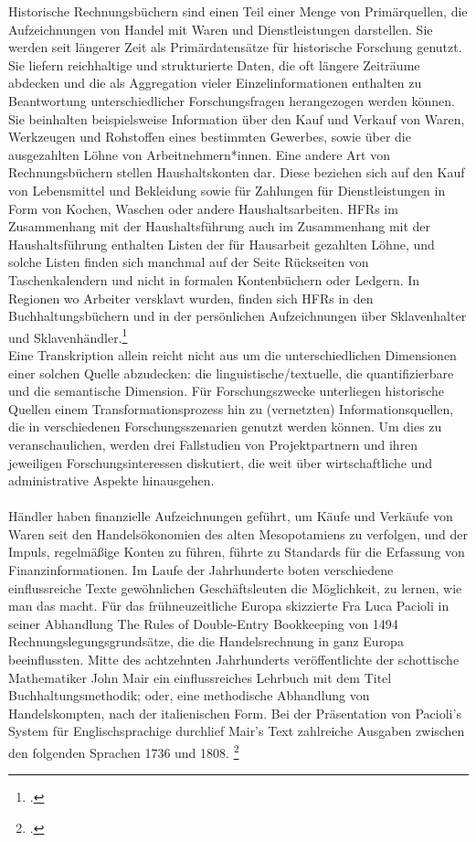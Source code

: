 \documentclass[12pt,a4paper]{article}
\begin{document}
Historische Rechnungsbüchern sind einen Teil einer Menge von Primärquellen, die Aufzeichnungen von Handel mit Waren und Dienstleistungen darstellen. Sie werden seit längerer Zeit als Primärdatensätze für historische Forschung genutzt. Sie liefern reichhaltige und strukturierte Daten, die oft längere Zeiträume abdecken und die als Aggregation vieler Einzelinformationen enthalten zu Beantwortung unterschiedlicher Forschungsfragen herangezogen werden können. Sie beinhalten beispielsweise Information über den Kauf und Verkauf von Waren, Werkzeugen und Rohstoffen eines bestimmten Gewerbes, sowie über die ausgezahlten Löhne von Arbeitnehmern*innen. Eine andere Art von Rechnungsbüchern stellen Haushaltskonten dar. Diese beziehen sich auf den Kauf von Lebensmittel und Bekleidung sowie für Zahlungen für Dienstleistungen in Form von Kochen, Waschen oder andere Haushaltsarbeiten.   HFRs im Zusammenhang mit der Haushaltsführung auch im Zusammenhang mit der Haushaltsführung enthalten Listen der für Hausarbeit gezahlten Löhne, und solche Listen finden sich manchmal auf der Seite Rückseiten von Taschenkalendern und nicht in formalen Kontenbüchern oder Ledgern. In Regionen wo Arbeiter versklavt wurden, finden sich HFRs in den Buchhaltungsbüchern und in der persönlichen Aufzeichnungen über Sklavenhalter und Sklavenhändler.\footcite[][S.2]{tomasek2013encoding}
\\
Eine Transkription allein reicht nicht aus um die unterschiedlichen Dimensionen einer solchen Quelle abzudecken: die linguistische/textuelle, die quantifizierbare und die semantische Dimension. Für Forschungszwecke unterliegen historische Quellen einem Transformationsprozess hin zu (vernetzten) Informationsquellen, die in verschiedenen Forschungsszenarien genutzt werden können. Um dies zu veranschaulichen, werden drei Fallstudien von Projektpartnern und ihren jeweiligen Forschungsinteressen diskutiert, die weit über wirtschaftliche und administrative Aspekte hinausgehen.
\\
\\
Händler haben finanzielle Aufzeichnungen geführt, um Käufe und Verkäufe von Waren seit den Handelsökonomien des alten Mesopotamiens zu verfolgen, und der Impuls, regelmäßige Konten zu führen, führte zu Standards für die Erfassung von Finanzinformationen. Im Laufe der Jahrhunderte boten verschiedene einflussreiche Texte gewöhnlichen Geschäftsleuten die Möglichkeit, zu lernen, wie man das macht. Für das frühneuzeitliche Europa skizzierte Fra Luca Pacioli in seiner Abhandlung The Rules of Double-Entry Bookkeeping von 1494 Rechnungslegungsgrundsätze, die die Handelsrechnung in ganz Europa beeinflussten. Mitte des achtzehnten Jahrhunderts veröffentlichte der schottische Mathematiker John Mair ein einflussreiches Lehrbuch mit dem Titel 
Buchhaltungsmethodik; oder, eine methodische Abhandlung von Handelskompten, nach der italienischen Form. Bei der Präsentation von Pacioli's System für Englischsprachige durchlief Mair's Text zahlreiche Ausgaben zwischen den folgenden Sprachen 1736 und 1808. \footcite[][S.3]{tomasek2013encoding}
\end{document}
